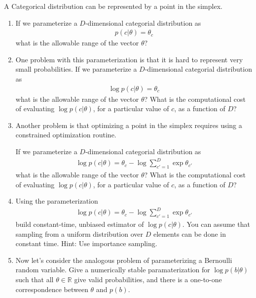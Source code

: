 \documentclass{harvardml}
\theoremstyle{plain}
\begin{document}
\begin{problem}

A Categorical distribution can be represented by a point in the simplex.

\begin{enumerate}[label=(\alph*)]
\item If we parameterize a $D$-dimensional categorial distribution as
%
\begin{align}
p(c | \theta) = \theta_c
\end{align}
%
what is the allowable range of the vector $\theta$?

\item One problem with this parameterization is that it is hard to represent very small probabilities.
If we parameterize a $D$-dimensional categorial distribution as
%
\begin{align}
\log p(c | \theta) = \theta_c
\end{align}
%
what is the allowable range of the vector $\theta$?
What is the computational cost of evaluating $\log p(c | \theta)$, for a particular value of $c$, as a function of $D$?

\item Another problem is that optimizing a point in the simplex requires using a constrained optimization routine.

If we parameterize a $D$-dimensional categorial distribution as
%
\begin{align}
\log p(c | \theta) = \theta_c - \log \sum_{c' = 1}^D \exp \theta_{c'}
\end{align}
%
what is the allowable range of the vector $\theta$? 
What is the computational cost of evaluating $\log p(c | \theta)$, for a particular value of $c$, as a function of $D$?

\item Using the parameterization 
%
\begin{align}
\log p(c | \theta) = \theta_c - \log \sum_{c' = 1}^D \exp \theta_{c'}
\end{align}
%
build constant-time, unbiased estimator of $\log p(c | \theta)$.
You can assume that sampling from a uniform distribution over $D$ elements can be done in constant time.
Hint: Use importance sampling.

\item Now let's consider the analogous problem of parameterizing a Bernoulli random variable.
Give a numerically stable paramaterization for $\log p(b | \theta)$ such that all $\theta \in \mathbb{R}$ give valid probabilities, and there is a one-to-one correspondence between $\theta$ and $p(b)$.
\end{enumerate}

\end{problem}
\end{document}
